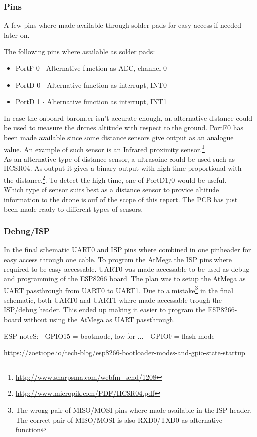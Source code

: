 \subsubsection{Pins}
A few pins where made available through solder pads for easy access if needed later on.

The following pins where available as solder pads:
\begin{itemize}
	\item PortF 0 - Alternative function as ADC, channel 0
	\item PortD 0 - Alternative function as interrupt, INT0
	\item PortD 1 - Alternative function as interrupt, INT1
\end{itemize}
In case the onboard baromter isn't accurate enough, an alternative distance could be used to measure the drones altitude with respect to the ground.
PortF0 has been made available since some distance sensors give output as an analogue value. 
An example of such sensor is an Infrared proximity sensor.\footnote{\url{http://www.sharpsma.com/webfm\_send/1208}} \\
As an alternative type of distance sensor, a ultrasoinc could be used such as HCSR04.
As output it gives a binary output with high-time proportional with the distance.\footnote{\url{http://www.micropik.com/PDF/HCSR04.pdf}}.
To detect the high-time, one of PortD1/0 would be useful. \\

Which type of sensor suits best as a distance sensor to provice altitude information to the drone is ouf of the scope of this report. The PCB has just been made ready to different types of sensors.

\subsubsection{Debug/ISP}
In the final schematic UART0 and ISP pins where combined in one pinheader for easy access through one cable. 
To program the AtMega the ISP pins where required to be easy accessable. 
UART0 was made accessable to be used as debug and programming of the ESP8266 board.
The plan was to setup the AtMega as UART passthrough from UART0 to UART1.
Due to a mistake\footnote{The wrong pair of MISO/MOSI pins where made available in the ISP-header. The correct pair of MISO/MOSI is also RXD0/TXD0 as alternative function} in the final schematic, both UART0 and UART1 where made accessable trough the ISP/debug header. 
This ended up making it easier to program the ESP8266-board without using the AtMega as UART passthrough.

ESP noteS:
 - GPIO15 = bootmode, low for ...
 - GPIO0 = flash mode
 
 
 https://zoetrope.io/tech-blog/esp8266-bootloader-modes-and-gpio-state-startup
